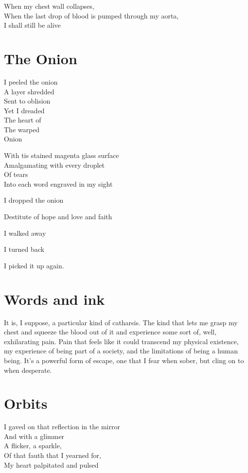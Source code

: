 \documentclass[parskip=half-,12pt,oneside,openany,a5paper,numbers=endperiod]{scrbook}
\begin{document}
When my chest wall collapses,\\
When the last drop of blood is pumped through my aorta,\\
I shall still be alive

\chapter{The Onion}

I peeled the onion\\
A layer shredded\\
Sent to oblision\\
Yet I dreaded\\
The heart of\\
The warped\\
Onion

With tis stained magenta glass surface\\
Amalgamating with every droplet\\
Of tears\\
Into each word engraved in my sight

I dropped the onion

Destitute of hope and love and faith

I walked away

I turned back

I picked it up again.

\chapter{Words and ink}

It is, I suppose, a particular kind of catharsis. The kind that lets me grasp
my chest and squeeze the blood out of it and experience some sort of, well,
exhilarating pain. Pain that feels like it could transcend my physical
existence, my experience of being part of a society, and the limitations of
being a human being. It's a powerful form of escape, one that I fear when
sober, but cling on to when desperate.

\chapter{Orbits}

I gaved on that reflection in the mirror\\
And with a glimmer\\
A flicker, a sparkle,\\
Of that fauth that I yearned for,\\
My heart palpitated and pulsed
\end{document}
